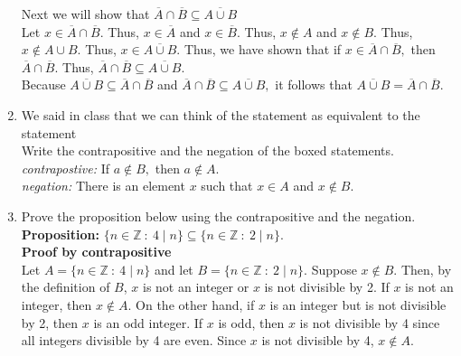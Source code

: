 \documentclass[11pt]{report}
\theoremstyle{plain}
\begin{document}
\begin{enumerate}
Next we will show that $\overline{A} \cap \overline{B}\subseteq\overline{A \cup B} $\\

Let $x \in \overline{A} \cap \overline{B}.$ Thus, $x \in \overline{A}$ and $ x \in \overline{B}.$ Thus, $x \not \in {A}$ and $ x \not \in {B}.$ Thus, $x \not \in A \cup B.$ Thus, $x \in \overline{A \cup B}.$ Thus,  we have shown that if $x \in \overline{A} \cap \overline{B},$  then $\overline{A} \cap \overline{B}.$ Thus, $\overline{A} \cap \overline{B} \subseteq  \overline{A \cup B}.$\\

Because  $\overline{A \cup B} \subseteq \overline{A} \cap \overline{B}$ and $\overline{A} \cap \overline{B}\subseteq\overline{A \cup B},$ it follows that $\overline{A \cup B} = \overline{A} \cap \overline{B}.$ \\


\item We said in class that we can think of the statement  as equivalent to the statement \\

Write the contrapositive and the negation of the boxed statements.\\

\emph{contrapostive:} If $a \not \in B,$ then $a \not \in A.$\\

\emph{negation:} There is an element $x$ such that $x \in A$ and $x \not \in B.$\\

\item Prove the proposition below using the contrapositive and the negation.\\

\textbf{Proposition:} $\{n \in \mathbb{Z} \: : \: 4\mid n \} \subseteq \{n \in \mathbb{Z} \: : \: 2\mid n\}.$\\

\textbf{Proof by contrapositive}\\
Let $A=\{n \in \mathbb{Z} \: : \: 4\mid n \}$ and let $B= \{n \in \mathbb{Z} \: : \: 2\mid n\}.$ Suppose $x \not \in B.$ Then, by the definition of $B$, $x$ is not an integer or $x$ is not divisible by 2. If $x$ is not an integer, then $x \not \in A.$ On the other hand, if $x$ is an integer but is not divisible by 2, then $x$ is an odd integer. If $x$ is odd, then $x$ is not divisible by 4 since all integers divisible by 4 are even. Since $x$ is not divisible by 4, $x \not \in A.$\\


\end{enumerate}
\end{document}
